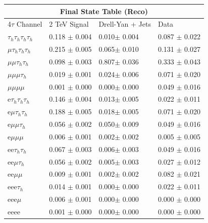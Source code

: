 \documentclass{article}
\begin{document}
 
\begin{landscape} 
\centering 
\begin{tabular}{|p{4.5cm}|p{3cm}|p{3cm}|p{3cm}|}\hline 
\multicolumn{4}{|c|}{Final State Table (Reco)} \\ 
\hline 
4$\tau$ Channel & 2 TeV Signal & Drell-Yan + Jets & Data \\ 
\hline 
$\tau_h$$\tau_h$$\tau_h$$\tau_h$ & 0.118 $\pm$ 0.004 & 0.010$\pm$ 0.004 & 0.087 $\pm$ 0.022\\
\hline 
$\mu$$\tau_h$$\tau_h$$\tau_h$ & 0.215 $\pm$ 0.005 & 0.065$\pm$ 0.010 & 0.131 $\pm$ 0.027\\
\hline 
$\mu$$\mu$$\tau_h$$\tau_h$ & 0.098 $\pm$ 0.003 & 0.807$\pm$ 0.036 & 0.333 $\pm$ 0.043\\
\hline 
$\mu$$\mu$$\mu$$\tau_h$ & 0.019 $\pm$ 0.001 & 0.024$\pm$ 0.006 & 0.071 $\pm$ 0.020\\
\hline 
$\mu$$\mu$$\mu$$\mu$ & 0.001 $\pm$ 0.000 & 0.000$\pm$ 0.000 & 0.049 $\pm$ 0.016\\
\hline 
e$\tau_h$$\tau_h$$\tau_h$ & 0.146 $\pm$ 0.004 & 0.013$\pm$ 0.005 & 0.022 $\pm$ 0.011\\
\hline 
e$\mu$$\tau_h$$\tau_h$ & 0.188 $\pm$ 0.005 & 0.018$\pm$ 0.005 & 0.071 $\pm$ 0.020\\
\hline 
e$\mu$$\mu$$\tau_h$ & 0.056 $\pm$ 0.002 & 0.050$\pm$ 0.009 & 0.049 $\pm$ 0.016\\
\hline 
e$\mu$$\mu$$\mu$ & 0.006 $\pm$ 0.001 & 0.002$\pm$ 0.002 & 0.005 $\pm$ 0.005\\
\hline 
ee$\tau_h$$\tau_h$ & 0.067 $\pm$ 0.003 & 0.006$\pm$ 0.003 & 0.049 $\pm$ 0.016\\
\hline 
ee$\mu$$\tau_h$ & 0.056 $\pm$ 0.002 & 0.005$\pm$ 0.003 & 0.027 $\pm$ 0.012\\
\hline 
ee$\mu$$\mu$ & 0.009 $\pm$ 0.001 & 0.002$\pm$ 0.002 & 0.082 $\pm$ 0.021\\
\hline 
eee$\tau_h$ & 0.014 $\pm$ 0.001 & 0.000$\pm$ 0.000 & 0.022 $\pm$ 0.011\\
\hline 
eee$\mu$ & 0.006 $\pm$ 0.001 & 0.000$\pm$ 0.000 & 0.000 $\pm$ 0.000\\
\hline 
eeee & 0.001 $\pm$ 0.000 & 0.000$\pm$ 0.000 & 0.000 $\pm$ 0.000\\
\hline 
\end{tabular} 
\end{landscape} 
\end{document}
